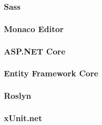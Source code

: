 \subsubsection{Sass}

\subsubsection{Monaco Editor}


\subsubsection{ASP.NET Core}

\subsubsection{Entity Framework Core}


\subsubsection{Roslyn}

\subsubsection{xUnit.net}


